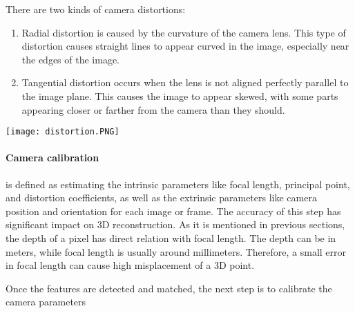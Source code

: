 \documentclass[11pt]{article}
\begin{document}
    There are two kinds of camera distortions:

    \begin{enumerate}
        \item Radial distortion is caused by the curvature of the camera lens. This type of distortion
        causes straight lines to appear curved in the image, especially near the edges of the image.
        \item Tangential distortion occurs when the lens is not aligned perfectly parallel to the image plane.
        This causes the image to appear skewed, with some parts appearing closer or farther from the camera
        than they should.
    \end{enumerate}
    {\texttt{[image: distortion.PNG]}}

    \paragraph{Camera calibration}is defined as estimating the intrinsic parameters like focal length,
    principal point, and distortion coefficients, as well as the extrinsic parameters like camera position
    and orientation for each image or frame. The accuracy of this step has significant impact on 3D reconstruction.
    As it is mentioned in previous sections, the depth of a pixel has direct relation with focal length. The depth
    can be in meters, while focal length is usually around millimeters. Therefore, a small error in focal length
    can cause high misplacement of a 3D point.

Once the features are detected and matched, the next step is to calibrate the camera parameters
\end{document}
